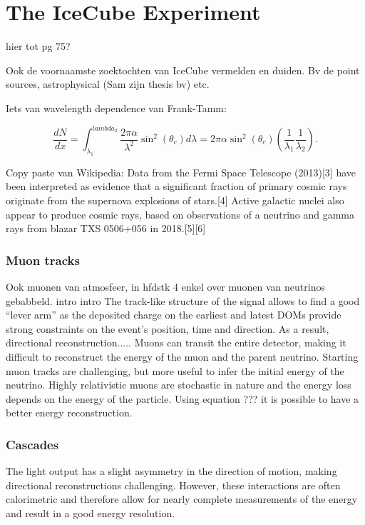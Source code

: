 \chapter{The IceCube Experiment}

hier tot pg 75?

Ook de voornaamste zoektochten van IceCube vermelden en duiden. Bv de point sources, astrophysical (Sam zijn thesis bv) etc.


Iets van wavelength dependence van Frank-Tamm:

\begin{equation}
\frac{dN}{dx} = \int_{\lambda_1}^{lambda_2} \frac{2 \pi \alpha}{\lambda^2} \sin^2 \left(\theta_c\right) d\lambda = 2\pi \alpha \sin^2 \left(\theta_c\right) \left(\frac{1}{\lambda_1} \frac{1}{\lambda_2}\right).
\end{equation}

Copy paste van Wikipedia:
 Data from the Fermi Space Telescope (2013)[3] have been interpreted as evidence that a significant fraction of primary cosmic rays originate from the supernova explosions of stars.[4] Active galactic nuclei also appear to produce cosmic rays, based on observations of a neutrino and gamma rays from blazar TXS 0506+056 in 2018.[5][6]
 

\subsection{Muon tracks}
Ook muonen van atmosfeer, in hfdstk 4 enkel over muonen van neutrinos gebabbeld.
intro intro
The track-like structure of the signal allows to find a good ``lever arm'' as the deposited charge on the earliest and latest DOMs provide strong constraints on the event's position, time and direction. As a result, directional reconstruction..... Muons can transit the entire detector, making it difficult to reconstruct the energy of the muon and the parent neutrino. Starting muon tracks are challenging, but more useful to infer the initial energy of the neutrino. Highly relativistic muons are stochastic in nature and the energy loss depends on the energy of the particle. Using equation ??? it is possible to have a better energy reconstruction.
\subsection{Cascades}
The light output has a slight asymmetry in the direction of motion, making directional reconstructions challenging. However, these interactions are often calorimetric and therefore allow for nearly complete measurements of the energy and result in a good energy resolution.

